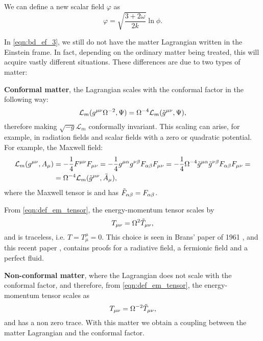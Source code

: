 We can define a new scalar field $\varphi$ as
\begin{equation}
    \varphi =\sqrt{\frac{3+2\omega}{2k}}\ln\phi.
\end{equation}

In \cref{eqn:bd_ef_3}, we still do not have the matter Lagrangian written in the Einstein frame. In fact, depending on the ordinary matter being treated, this will acquire vastly different situations. These differences are due to two types of matter: 

\textbf{Conformal matter}, the Lagrangian scales with the conformal factor in the following way:
\begin{equation}
\mathcal{L}_m(g^{\mu\nu}\Omega^{-2},\Psi)=\Omega^{-4}\mathcal{L}_m(\Tilde{g}^{\mu\nu},\Psi),
\end{equation}
therefore making $\sqrt{-g}\mathcal{L}_m$ conformally invariant. This scaling can arise, for example, in radiation fields and scalar fields with a zero or quadratic potential. For example, the Maxwell field:
\begin{align}
     \mathcal{L}_m(g^{\mu\nu},A_\mu)&=-\frac{1}{4}F^{\mu\nu}F_{\mu\nu}=-\frac{1}{4}g^{\mu\alpha}g^{\nu\beta}F_{\alpha\beta}F_{\mu\nu}=-\frac{1}{4}\Omega^{-4}\Tilde{g}^{\mu\alpha}\Tilde{g}^{\nu\beta}F_{\alpha\beta}F_{\mu\nu}=\nonumber\\
     &=\Omega^{-4}\mathcal{L}_m(\Tilde{g}^{\mu\nu},\Tilde{A}_\mu),
\end{align}
where the Maxwell tensor is and has $\Tilde{F}_{\alpha\beta}=F_{\alpha\beta}$.

From \cref{eqn:def_em_tensor}, the energy-momentum tensor scales by
\begin{equation}
    T_{\mu\nu}=\Omega^2\Tilde{T}_{\mu\nu},
\end{equation}
and is traceless, i.e. $T=T^\mu_\mu=0$. This choice is seen in Brans' paper of 1961 \cite{Brans_1961}, and this recent paper \cite{quiros2025}, contains proofs for a radiative field, a fermionic field and a perfect fluid.

\textbf{Non-conformal matter}, where the Lagrangian does not scale with the conformal factor, and therefore, from \cref{eqn:def_em_tensor}, the energy-momentum tensor scales as
\begin{equation}
    T_{\mu\nu}=\Omega^{-2}\Tilde{T}_{\mu\nu},
\end{equation}
and has a non zero trace. With this matter we obtain a coupling between the matter Lagrangian and the conformal factor.

